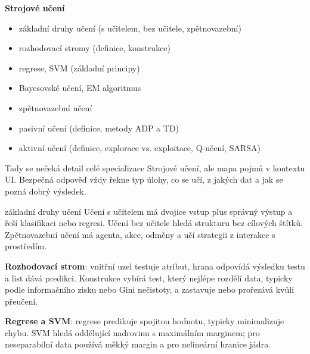 \begin{tema}
\textbf{Strojové učení}
\begin{itemize}[leftmargin=1.2em,itemsep=0pt,topsep=1pt]
  \item základní druhy učení (s učitelem, bez učitele, zpětnovazební)
  \item rozhodovací stromy (definice, konstrukce)
  \item regrese, SVM (základní principy)
  \item Bayesovské učení, EM algoritmus
  \item zpětnovazební učení
  \item pasivní učení (definice, metody ADP a TD)
  \item aktivní učení (definice, explorace vs. exploitace, Q-učení, SARSA)
\end{itemize}
\end{tema}
\begin{vezkratce}
\end{vezkratce}

\ucivo
\begin{intuice}
Tady se nečeká detail celé specializace Strojové učení, ale mapa pojmů v kontextu UI. Bezpečná odpověď vždy řekne typ úlohy, co se učí, z jakých dat a jak se pozná dobrý výsledek.
\end{intuice}

\begin{defbox}{základní druhy učení}
Učení s učitelem má dvojice vstup plus správný výstup a řeší klasifikaci nebo regresi. Učení bez učitele hledá strukturu bez cílových štítků. Zpětnovazební učení má agenta, akce, odměny a učí strategii z interakce s prostředím.
\end{defbox}

\textbf{Rozhodovací strom}: vnitřní uzel testuje atribut, hrana odpovídá výsledku testu a list dává predikci. Konstrukce vybírá test, který nejlépe rozdělí data, typicky podle informačního zisku nebo Gini nečistoty, a zastavuje nebo prořezává kvůli přeučení.

\textbf{Regrese a SVM}: regrese predikuje spojitou hodnotu, typicky minimalizuje chybu. SVM hledá oddělující nadrovinu s maximálním marginem; pro neseparabilní data používá měkký margin a pro nelineární hranice jádra.

